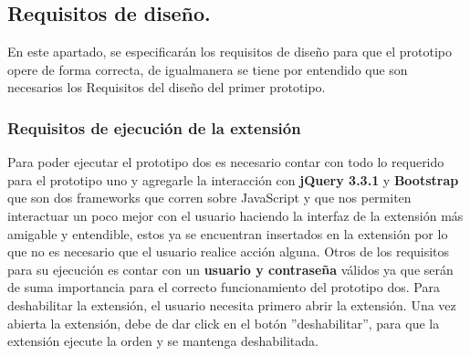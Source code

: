 \documentclass[12pt, a4paper, titlepage]{report}
\begin{document}
	
    	   
    	    \subsection{Requisitos de diseño.}
    			   En este apartado, se especificarán los requisitos de diseño para que el prototipo opere de forma correcta, de igualmanera se tiene por entendido que son necesarios los Requisitos del diseño del primer prototipo.
    			   \subsubsection{Requisitos de ejecución de la extensi\'on}
    			        Para poder ejecutar el prototipo dos es necesario contar con todo lo requerido para el prototipo uno y agregarle la interacci\'on con \textbf{jQuery 3.3.1 } y \textbf{Bootstrap} que son dos frameworks que corren sobre JavaScript y que nos permiten interactuar un poco mejor con el usuario haciendo la interfaz de la extensi\'on más amigable y entendible, estos ya se encuentran insertados en la extensión por lo que no es necesario que el usuario realice acción alguna.
    			        Otros de los requisitos para su ejecución es contar con un \textbf{usuario y contraseña} válidos ya que ser\'an de suma importancia para el correcto funcionamiento del prototipo dos. Para deshabilitar la extensión, el usuario necesita primero abrir la extensión. Una vez abierta la extensión, debe de dar click en el botón ''deshabilitar'', para que la extensión ejecute la orden y se mantenga deshabilitada.
\end{document}
